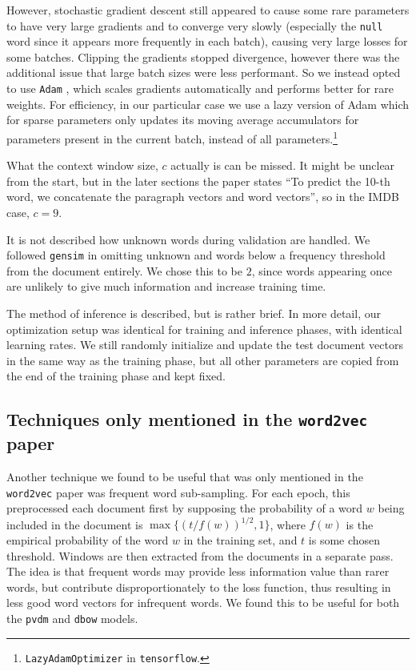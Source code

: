 \documentclass{article}
\begin{document}
However, stochastic gradient descent still appeared to cause some rare parameters to have very large gradients and to converge very slowly (especially the \texttt{null} word since it appears more frequently in each batch), causing very large losses for some batches. Clipping the gradients stopped divergence, however there was the additional issue that large batch sizes were less performant. So we instead opted to use \texttt{Adam} \citep{kingma_adam:_2014}, which scales gradients automatically and performs better for rare weights. For efficiency, in our particular case we use a lazy version of Adam which for sparse parameters only updates its moving average accumulators for parameters present in the current batch, instead of all parameters.\footnote{\texttt{LazyAdamOptimizer} in \texttt{tensorflow}.}

What the context window size, $c$ actually is can be missed. It might be unclear from the start, but in the later sections the paper states ``To predict the 10-th word, we concatenate the paragraph vectors and word vectors'', so in the IMDB case, $c=9$.

It is not described how unknown words during validation are handled. We followed \texttt{gensim} in omitting unknown and words below a frequency threshold from the document entirely. We chose this to be $2$, since words appearing once are unlikely to give much information and increase training time.

The method of inference is described, but is rather brief. In more detail, our optimization setup was identical for training and inference phases, with identical learning rates. We still randomly initialize and update the test document vectors in the same way as the training phase, but all other parameters are copied from the end of the training phase and kept fixed.

\subsection{Techniques only mentioned in the \texttt{word2vec} paper}
Another technique we found to be useful that was only mentioned in the \texttt{word2vec} paper was frequent word sub-sampling. For each epoch, this preprocessed each document first by supposing the probability of a word $w$ being included in the document is $\max\{(t/f(w))^{1/2}, 1\}$, where $f(w)$ is the empirical probability of the word ${w}$ in the training set, and $t$ is some chosen threshold. Windows are then extracted from the documents in a separate pass. The idea is that frequent words may provide less information value than rarer words, but contribute disproportionately to the loss function, thus resulting in less good word vectors for infrequent words. We found this to be useful for both the \texttt{pvdm} and \texttt{dbow} models.
\end{document}
